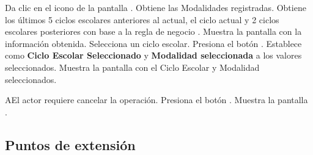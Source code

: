 \begin{UCtrayectoria}	

    \UCpaso[\UCactor] \label{cancelar}Da clic en el icono \IUEditar de la pantalla .
    \UCpaso Obtiene las Modalidades registradas.
    \UCpaso Obtiene los últimos 5 ciclos escolares anteriores al actual, el ciclo actual y 2 ciclos escolares posteriores con base a la regla de negocio .
    \UCpaso Muestra la pantalla  con la información obtenida.
    \UCpaso [\UCactor] Selecciona un ciclo escolar.
    \UCpaso [\UCactor] \label{DAE-IN-CU1:acp} Presiona el botón .  
    \UCpaso Establece como {\bf Ciclo Escolar Seleccionado} y {\bf Modalidad seleccionada} a los valores seleccionados.
    \UCpaso Muestra la pantalla  con el Ciclo Escolar y Modalidad seleccionados.
\end{UCtrayectoria}

\begin{UCtrayectoriaA}{A}{El actor requiere cancelar la operación.}
\UCpaso Presiona el botón .
\UCpaso Muestra la pantalla .
\end{UCtrayectoriaA}

\subsection{Puntos de extensión}



